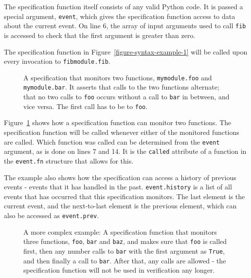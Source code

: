 \documentclass[a4paper,11pt]{kth-mag}
\begin{document}
The specification function itself consists of any valid Python code. It is
passed a special argument, \texttt{event}, which gives the specification
function access to data about the current event. On line 6, the array of input
arguments used to call \texttt{fib} is accessed to check that the first
argument is greater than zero.

The specification function in Figure~\ref{figure-syntax-example-1} will be
called upon every invocation to \texttt{fibmodule.fib}.

\begin{figure}[h!]
	\begin{center}
	\begin{minipage}{0.7\textwidth}
	
	\end{minipage}
	\end{center}

	\caption{A specification that monitors two functions, \texttt{mymodule.foo}
		and \texttt{mymodule.bar}. It asserts that calls to the two functions
		alternate; that no two calls to \texttt{foo} occurs without a call to
		\texttt{bar} in between, and vice versa. The first call has to be to
		\texttt{foo}.}
	\label{figure-syntax-example-2}
\end{figure}

Figure~\ref{figure-syntax-example-2} shows how a specification function can
monitor two functions. The specification function will be called whenever
either of the monitored functions are called. Which function was called can be
determined from the \texttt{event} argument, as is done on lines 7 and 14. It
is the \texttt{called} attribute of a function in the \texttt{event.fn}
structure that allows for this.

The example also shows how the specification can access a history of previous
events - events that it has handled in the past. \texttt{event.history} is a
list of all events that has occurred that this specification monitors. The last
element is the current event, and the next-to-last element is the previous
element, which can also be accessed as \texttt{event.prev}.

\begin{figure}[h!]
	\begin{center}
	\begin{minipage}{0.7\textwidth}
	
	\end{minipage}
	\end{center}

	\caption{A more complex example: A specification function that monitors three
		functions, \texttt{foo}, \texttt{bar} and \texttt{baz}, and makes sure that
		\texttt{foo} is called first, then any number calls to \texttt{bar} with
		the first argument as \texttt{True}, and then finally a call to
	\texttt{bar}. After that, any calls are allowed - the specification function
will not be used in verification any longer.}
	\label{figure-syntax-example-3}
\end{figure}
\end{document}

